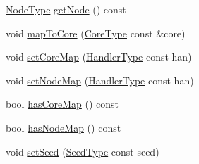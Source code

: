 \begin{DoxyCompactItemize}
\item 
\hyperlink{namespacevt_a866da9d0efc19c0a1ce79e9e492f47e2}{Node\+Type} \hyperlink{structvt_1_1vrt_1_1_virtual_info_aac6a0d894c563a3c347930e872541e1b}{get\+Node} () const
\item 
void \hyperlink{structvt_1_1vrt_1_1_virtual_info_a69fa103c7e796005f8032efc33e236cf}{map\+To\+Core} (\hyperlink{namespacevt_a74b11b22c02feaabab8591acc87c7c52}{Core\+Type} const \&core)
\item 
void \hyperlink{structvt_1_1vrt_1_1_virtual_info_ad2bc75966ac3a5c7faaf14bfe47b5ba4}{set\+Core\+Map} (\hyperlink{namespacevt_af64846b57dfcaf104da3ef6967917573}{Handler\+Type} const han)
\item 
void \hyperlink{structvt_1_1vrt_1_1_virtual_info_acb0b673b07b17b8eb83a91168e6c5658}{set\+Node\+Map} (\hyperlink{namespacevt_af64846b57dfcaf104da3ef6967917573}{Handler\+Type} const han)
\item 
bool \hyperlink{structvt_1_1vrt_1_1_virtual_info_afe2aa8089ee3fde02c189e473e698eb4}{has\+Core\+Map} () const
\item 
bool \hyperlink{structvt_1_1vrt_1_1_virtual_info_ae5153180aa0fdc89268929e9fa334692}{has\+Node\+Map} () const
\item 
void \hyperlink{structvt_1_1vrt_1_1_virtual_info_a5c90fa0c4f42e6e80552a66403137d3f}{set\+Seed} (\hyperlink{namespacevt_ae2e13198bdef4d5b8e603d6c1c7f0969}{Seed\+Type} const seed)
\end{DoxyCompactItemize}
